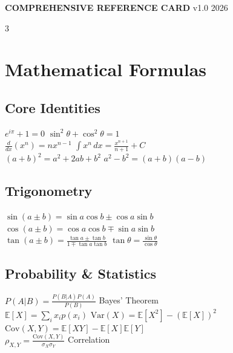 \documentclass[7pt,landscape]{extarticle}
\begin{document}
\noindent\colorbox{csPrimary}{%
    \parbox{\dimexpr\textwidth-2\fboxsep\relax}{%
        \centering\color{white}%
        \fontsize{9pt}{11pt}\selectfont\textbf{COMPREHENSIVE REFERENCE CARD}%
        \hfill%
        \fontsize{6pt}{7pt}\selectfont v1.0 \textbar{} 2026%
    }%
}

\vspace{0.5mm}

\begin{multicols*}{3}

\section*{Mathematical Formulas}

\subsection*{Core Identities}
$e^{i\pi} + 1 = 0$ \hfill $\sin^2\theta + \cos^2\theta = 1$ \\
$\frac{d}{dx}(x^n) = nx^{n-1}$ \hfill $\int x^n\,dx = \frac{x^{n+1}}{n+1}+C$ \\
$(a+b)^2 = a^2 + 2ab + b^2$ \hfill $a^2 - b^2 = (a+b)(a-b)$

\subsection*{Trigonometry}
$\sin(a \pm b) = \sin a \cos b \pm \cos a \sin b$ \\
$\cos(a \pm b) = \cos a \cos b \mp \sin a \sin b$ \\
$\tan(a \pm b) = \frac{\tan a \pm \tan b}{1 \mp \tan a \tan b}$ \hfill $\tan\theta = \frac{\sin\theta}{\cos\theta}$

\subsection*{Probability \& Statistics}
$P(A|B) = \frac{P(B|A)P(A)}{P(B)}$ \hfill Bayes' Theorem \\
$\mathbb{E}[X] = \sum_i x_i p(x_i)$ \hfill $\text{Var}(X) = \mathbb{E}[X^2] - (\mathbb{E}[X])^2$ \\
$\text{Cov}(X,Y) = \mathbb{E}[XY] - \mathbb{E}[X]\mathbb{E}[Y]$ \\
$\rho_{X,Y} = \frac{\text{Cov}(X,Y)}{\sigma_X \sigma_Y}$ \hfill Correlation


\end{multicols*}
\end{document}
